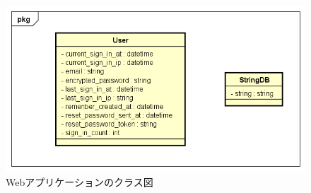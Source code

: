 \begin{figure}
\begin{center}
\includegraphics[width=17cm]{fig/class_web.png}
\end{center}
\caption{Webアプリケーションのクラス図}
\end{figure}
